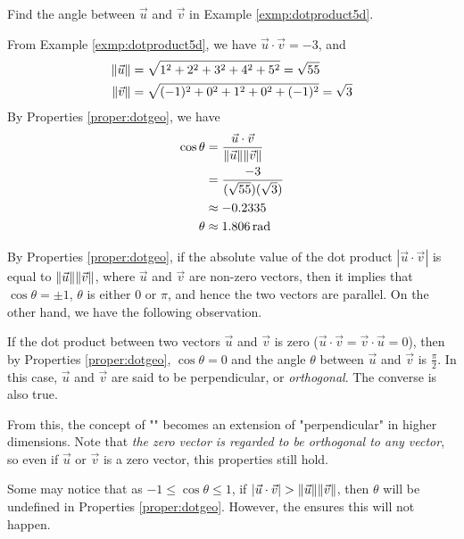 \begin{exmp}
Find the angle between $\vec{u}$ and $\vec{v}$ in Example \ref{exmp:dotproduct5d}.
\end{exmp}
\begin{solution}
From Example \ref{exmp:dotproduct5d}, we have $\vec{u} \cdot \vec{v} = -3$, and
\begin{align*}
\norm{\vec{u}} &= \sqrt{1^2 + 2^2 + 3^2 + 4^2 + 5^2} = \sqrt{55} \\
\norm{\vec{v}} &= \sqrt{(-1)^2 + 0^2 + 1^2 + 0^2 + (-1)^2} = \sqrt{3} 
\end{align*}
By Properties \ref{proper:dotgeo}, we have
\begin{align*}
\cos\theta &= \frac{\vec{u} \cdot \vec{v}}{\norm{\vec{u}}\norm{\vec{v}}} \\
&= \frac{-3}{(\sqrt{55})(\sqrt{3})} \\
&\approx -0.2335 \\
\theta &\approx \SI{1.806}{\radian}
\end{align*}
\end{solution}
By Properties \ref{proper:dotgeo}, if the absolute value of the dot product $|\vec{u} \cdot \vec{v}|$ is equal to $\norm{\vec{u}}\norm{\vec{v}}$, where $\vec{u}$ and $\vec{v}$ are non-zero vectors, then it implies that $\cos\theta = \pm 1$, $\theta$ is either $0$ or $\pi$, and hence the two vectors are parallel. On the other hand, we have the following observation.
\begin{proper}
\label{proper:dotorth}
If the dot product between two vectors $\vec{u}$ and $\vec{v}$ is zero ($\vec{u} \cdot \vec{v} = \vec{v} \cdot \vec{u} = 0$), then by Properties \ref{proper:dotgeo}, $\cos\theta = 0$ and the angle $\theta$ between $\vec{u}$ and $\vec{v}$ is $\frac{\pi}{2}$. In this case, $\vec{u}$ and $\vec{v}$ are said to be perpendicular, or \textit{orthogonal}. The converse is also true. 
\end{proper}
From this, the concept of "" becomes an extension of "perpendicular" in higher dimensions. Note that \textit{the zero vector is regarded to be orthogonal to any vector}, so even if $\vec{u}$ or $\vec{v}$ is a zero vector, this properties still hold. \par
Some may notice that as $-1 \leq \cos\theta \leq 1$, if $|\vec{u} \cdot \vec{v}| > \norm{\vec{u}}\norm{\vec{v}}$, then $\theta$ will be undefined in Properties \ref{proper:dotgeo}. However, the  ensures this will not happen.

